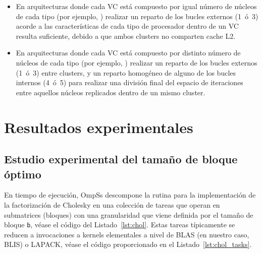 \begin{itemize}
	\item En arquitecturas donde cada VC está compuesto por igual número de núcleos de cada tipo (por ejemplo, \odroid) realizar un reparto
		de los bucles externos (1~ó~3) acorde a las características de cada tipo de procesador dentro de un VC resulta suficiente, debido
		a que ambos clusters no comparten cache L2.

	\item En arquitecturas donde cada VC está compuesto por distinto número de núcleos de cada tipo (por ejemplo, \juno) realizar
		un reparto de los bucles externos (1~ó~3) entre clusters, y un reparto homogéneo de alguno de los bucles internos (4~ó~5) para realizar
		una división final del espacio de iteraciones entre aquellos núcleos replicados dentro de un mismo cluster.

\end{itemize}




\section{Resultados experimentales}

\subsection{Estudio experimental del tamaño de bloque óptimo}

En tiempo de ejecución, OmpSs descompone la rutina para la implementación
de la factorización de Cholesky en una colección de tareas que operan en
submatrices (bloques) con una granularidad que viene definida por el tamaño
de bloque {\tt b}, véase el código del Listado~\ref{lst:chol}. Estas
tareas típicamente se reducen a invocaciones a kernels elementales a nivel
de BLAS (en nuestro caso, BLIS) o LAPACK, véase el código proporcionado en
el Listado~\ref{lst:chol_tasks}.

